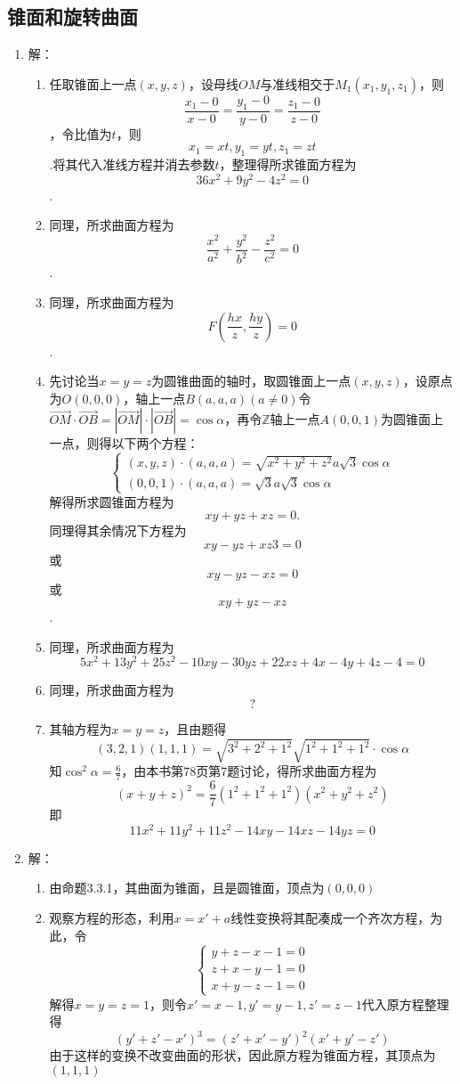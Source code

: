 \documentclass[UTF8]{ctexart}
\begin{document}
\subsection{锥面和旋转曲面}
\begin{enumerate}
\item 解：\begin{enumerate}[(1)]
\item 任取锥面上一点$\left(x,y,z\right)$，设母线$OM$与准线相交于$M_1\left(x_1,y_1,z_1\right)$，则$$\frac{x_1-0}{x-0}=\frac{y_1-0}{y-0}=\frac{z_1-0}{z-0}$$，令比值为$t$，则$$x_1=xt,y_1=yt,z_1=zt$$.将其代入准线方程并消去参数$t$，整理得所求锥面方程为$$36x^2+9y^2-4z^2=0$$.
\item 同理，所求曲面方程为$$\frac{x^2}{a^2}+\frac{y^2}{b^2}-\frac{z^2}{c^2}=0$$.
\item 同理，所求曲面方程为$$F\left(\frac{hx}{z},\frac{hy}{z}\right)=0$$.
\item 先讨论当$x=y=z$为圆锥曲面的轴时，取圆锥面上一点$\left(x,y,z\right)$，设原点为$O\left(0,0,0\right)$，轴上一点$B\left(a,a,a\right)\left(a\neq0\right)$令$\overrightarrow{OM}\cdot\overrightarrow{OB}=\left|\overrightarrow{OM}\right|\cdot\left|\overrightarrow{OB}\right|=\cos\alpha$，再令$\mathbb{Z}$轴上一点$A\left(0,0,1\right)$为圆锥面上一点，则得以下两个方程：$$\left\{\begin{array}{l}\left(x,y,z\right)\cdot\left(a,a,a\right)=\sqrt{x^2+y^2+z^2}a\sqrt{3}\cos\alpha\\\left(0,0,1\right)\cdot\left(a,a,a\right)=\sqrt{3}a\sqrt{3}\cos\alpha\end{array}\right.$$解得所求圆锥面方程为$$xy+yz+xz=0.$$
同理得其余情况下方程为$$xy-yz+xz3=0$$或$$xy-yz-xz=0$$或$$xy+yz-xz$$.
\item 同理，所求曲面方程为$$5x^2+13y^2+25z^2-10xy-30yz+22xz+4x-4y+4z-4=0$$
\item 同理，所求曲面方程为$$?$$
\item 其轴方程为$x=y=z$，且由题得$$\left(3,2,1\right)\left(1,1,1\right)=\sqrt{3^2+2^2+1^2}\sqrt{1^2+1^2+1^2}\cdot\cos\alpha$$知$\cos^2\alpha=\displaystyle\frac{6}{7}$，由本书第78页第7题讨论，得所求曲面方程为$$\left(x+y+z\right)^2=\frac{6}{7}\left(1^2+1^2+1^2\right)\left(x^2+y^2+z^2\right)$$即$$11x^2+11y^2+11z^2-14xy-14xz-14yz=0$$
\end{enumerate}

\item 解：\begin{enumerate}[(1)]
\item 由命题3.3.1，其曲面为锥面，且是圆锥面，顶点为$\left(0,0,0\right)$
\item 观察方程的形态，利用$x=x'+a$线性变换将其配凑成一个齐次方程，为此，令$$\left\{\begin{array}{l}y+z-x-1=0\\z+x-y-1=0\\x+y-z-1=0\end{array}\right.$$解得$x=y=z=1$，则令$x'=x-1,y'=y-1,z'=z-1$代入原方程整理得$$\left(y'+z'-x'\right)^3=\left(z'+x'-y'\right)^2\left(x'+y'-z'\right)$$由于这样的变换不改变曲面的形状，因此原方程为锥面方程，其顶点为$\left(1,1,1\right)$
\end{enumerate}


\end{enumerate}
\end{document}
